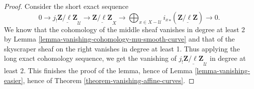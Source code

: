 \begin{proof}
Consider the short exact sequence
$$
0 \longrightarrow j_!\underline{\mathbf{Z}/\ell\mathbf{Z}}_\mathcal{U}
\longrightarrow \underline{\mathbf{Z}/\ell\mathbf{Z}}_X \longrightarrow
\bigoplus_{x \in X-\mathcal{U}} {i_x}_*(\underline{\mathbf{Z}/\ell\mathbf{Z}})
\longrightarrow 0.
$$
We know that the cohomology of the middle sheaf vanishes in degree at least 2
by
Lemma \ref{lemma-vanishing-cohomology-mu-smooth-curve}
and that of the skyscraper
sheaf on the right vanishes in degree at least 1. Thus applying the long exact
cohomology sequence, we get the vanishing of
$j_!\underline{\mathbf{Z}/\ell\mathbf{Z}}_\mathcal{U}$ in degree at least 2.
This finishes the proof of the lemma, hence of
Lemma \ref{lemma-vanishing-easier},
hence of
Theorem \ref{theorem-vanishing-affine-curves}.
\end{proof}

